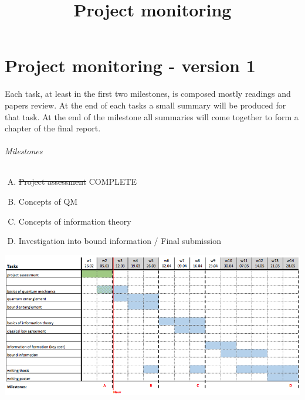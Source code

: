\documentclass{article}
\title{Project monitoring}
\begin{document}
\part*{Project monitoring - version 1}
Each task, at least in the first two milestones, is composed mostly readings and papers review.
At the end of each tasks a small summary will be produced for that task. 
At the end of the milestone all summaries will come together to form a chapter of the final report. \\

\paragraph*{Milestones}
\begin{enumerate}[A)]
\item \sout{Project assessment} COMPLETE 
\item Concepts of QM
\item Concepts of information theory
\item Investigation into bound information / Final submission
\end{enumerate}

\centerline{
	\includegraphics[scale=0.5]{gantt-1.png}
}
		
\end{document}

